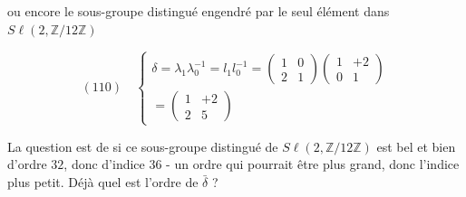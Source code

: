 ou encore le sous-groupe distingué engendré par
le seul élément dans $S\ell(2, \mathbb{Z}/12\mathbb{Z})$

$$ (110) \quad \left\{ \begin{array}{l} \delta = \lambda_1 \lambda_0^{-1} = l_1 l_0^{-1} = \left(\begin{array}{cc} 1 & 0 \\ 2 & 1 \end{array}\right) \left(\begin{array}{cc} 1 & +2 \\ 0 & 1 \end{array}\right) \\ = \left(\begin{array}{cc} 1 & +2 \\ 2 & 5 \end{array}\right) \end{array} \right. $$

La question est de si ce sous-groupe
distingué de $S\ell(2, \mathbb{Z}/12\mathbb{Z})$ est bel et
bien d'ordre $32$, donc d'indice $36$ - un
ordre qui pourrait être plus grand, donc l'indice
plus petit. Déjà quel est l'ordre de $\bar{\delta}$ ?

\newpage


